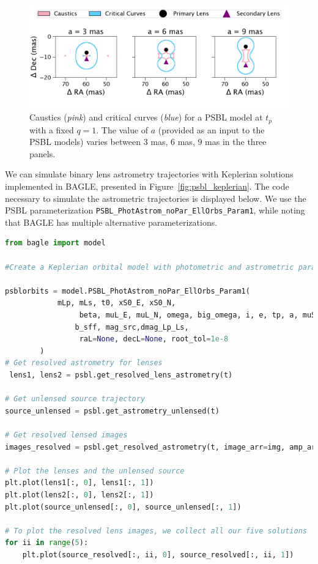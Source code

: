 \documentclass[twocolumn]{aastex701}
\newcommand{\tcomnot}{t_{com,0,\sun}}
\newcommand{\w}{\omega_{pri}}
\newcommand{\bigomega}{\Omega_{sec}}
\newcommand{\inclination}{\textit{i}}
\newcommand{\period}{\textit{P}}
\begin{document}
\begin{figure}
    \centering
    \includegraphics[width= \textwidth]{figures/magmaps_varysep.png}
    \caption{Caustics (\emph{pink}) and critical curves (\emph{blue}) for a PSBL model at $t_p$ with a fixed $q=1$. The value of $a$ (provided as an input to the PSBL models) varies between $3$ mas, $6$ mas, $9$ mas in the three panels.}
    \label{fig:magmaps_varysep}
\end{figure}

We can simulate binary lens astrometry trajectories with Keplerian solutions implemented in BAGLE, presented in Figure~\ref{fig:psbl_keplerian}. The code necessary to simulate the astrometric trajectories is displayed below. We use the PSBL parameterization \texttt{PSBL\_PhotAstrom\_noPar\_EllOrbs\_Param1}, while noting that BAGLE has multiple alternative parameterizations. 





\begin{lstlisting}[language=Python]
from bagle import model

#Create a Keplerian orbital model with photometric and astrometric parameters

psblorbits = model.PSBL_PhotAstrom_noPar_EllOrbs_Param1(
            mLp, mLs, t0, xS0_E, xS0_N,
                 beta, muL_E, muL_N, omega, big_omega, i, e, tp, a, muS_E, muS_N, dL, dS,
                b_sff, mag_src,dmag_Lp_Ls,
                 raL=None, decL=None, root_tol=1e-8
        )
# Get resolved astrometry for lenses
 lens1, lens2 = psbl.get_resolved_lens_astrometry(t)

# Get unlensed source trajectory 
source_unlensed = psbl.get_astrometry_unlensed(t)

# Get resolved lensed images 
images_resolved = psbl.get_resolved_astrometry(t, image_arr=img, amp_arr=amp)

# Plot the lenses and the unlensed source
plt.plot(lens1[:, 0], lens1[:, 1]) 
plt.plot(lens2[:, 0], lens2[:, 1])
plt.plot(source_unlensed[:, 0], source_unlensed[:, 1])

# To plot the resolved lens images, we collect all our five solutions
for ii in range(5):
    plt.plot(source_resolved[:, ii, 0], source_resolved[:, ii, 1])

\end{lstlisting}
\end{document}
